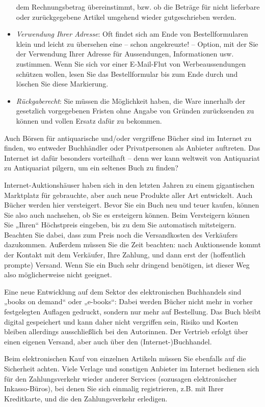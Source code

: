\documentclass[]{book}
\theoremstyle{definition}
\theoremstyle{definition}
\theoremstyle{definition}
\theoremstyle{remark}
\begin{document}
\begin{itemize}
  dem Rechnungsbetrag übereinstimmt, bzw. ob die Beträge für nicht
  lieferbare oder zurückgegebene Artikel umgehend wieder gutgeschrieben
  werden.
\item
  \emph{Verwendung Ihrer Adresse}: Oft findet sich am Ende von
  Bestellformularen klein und leicht zu übersehen eine -- schon
  angekreuzte! -- Option, mit der Sie der Verwendung Ihrer Adresse für
  Aussendungen, Informationen usw. zustimmen. Wenn Sie sich vor einer
  E-Mail-Flut von Werbeaussendungen schützen wollen, lesen Sie das
  Bestellformular bis zum Ende durch und löschen Sie diese Markierung.
\item
  \emph{Rückgaberecht}: Sie müssen die Möglichkeit haben, die Ware
  innerhalb der gesetzlich vorgegebenen Fristen ohne Angabe von Gründen
  zurücksenden zu können und vollen Ersatz dafür zu bekommen.
\end{itemize}

Auch Börsen für antiquarische und/oder vergriffene Bücher sind im
Internet zu finden, wo entweder Buchhändler oder Privatpersonen als
Anbieter auftreten. Das Internet ist dafür besonders vorteilhaft -- denn
wer kann weltweit von Antiquariat zu Antiquariat pilgern, um ein
seltenes Buch zu finden?

Internet-Auktionshäuser haben sich in den letzten Jahren zu einem
gigantischen Marktplatz für gebrauchte, aber auch neue Produkte aller
Art entwickelt. Auch Bücher werden hier versteigert. Bevor Sie ein Buch
neu und teuer kaufen, können Sie also auch nachsehen, ob Sie es
ersteigern können. Beim Versteigern können Sie „Ihren`` Höchstpreis
eingeben, bis zu dem Sie automatisch mitsteigern. Beachten Sie dabei,
dass zum Preis noch die Versandkosten des Verkäufers dazukommen.
Außerdem müssen Sie die Zeit beachten: nach Auktionsende kommt der
Kontakt mit dem Verkäufer, Ihre Zahlung, und dann erst der (hoffentlich
prompte) Versand. Wenn Sie ein Buch sehr dringend benötigen, ist dieser
Weg also möglicherweise nicht geeignet.

Eine neue Entwicklung auf dem Sektor des elektronischen Buchhandels sind
„books on demand`` oder „e-books``: Dabei werden Bücher nicht mehr in
vorher festgelegten Auflagen gedruckt, sondern nur mehr auf Bestellung.
Das Buch bleibt digital gespeichert und kann daher nicht vergriffen
sein, Risiko und Kosten bleiben allerdings ausschließlich bei den
Autorinnen. Der Vertrieb erfolgt über einen eigenen Versand, aber auch
über den (Internet-)Buchhandel.

Beim elektronischen Kauf von einzelnen Artikeln müssen Sie ebenfalls auf
die Sicherheit achten. Viele Verlage und sonstigen Anbieter im Internet
bedienen sich für den Zahlungsverkehr wieder anderer Services (sozusagen
elektronischer Inkasso-Büros), bei denen Sie sich einmalig registrieren,
z.B. mit Ihrer Kreditkarte, und die den Zahlungsverkehr erledigen.
\end{document}
